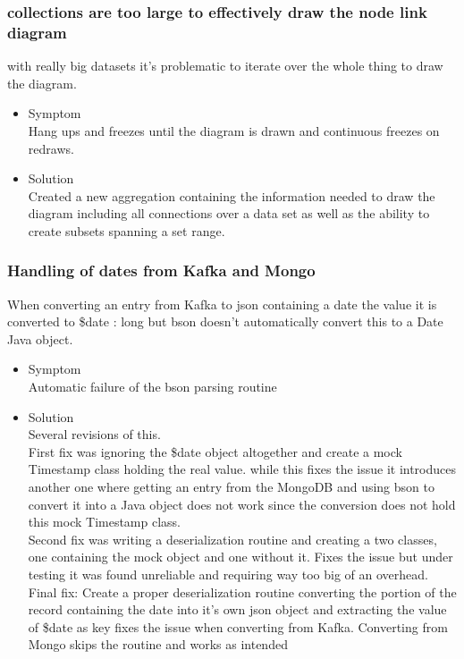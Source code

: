 \documentclass[oneside, english, final]{design}
\begin{document}
\subsubsection{collections are too large to effectively draw the node link diagram}

with really big datasets it's problematic to iterate over the whole thing to draw the diagram.

\begin{itemize}
      \item{Symptom
            \\
            Hang ups and freezes until the diagram is drawn and continuous freezes on redraws.
	}
      \item{Solution
            \\
            Created a new aggregation containing the information needed to draw the diagram including all connections over a data set as well as the ability to create subsets spanning a set range.
            }
\end{itemize}

\subsubsection{Handling of dates from Kafka and Mongo}

When converting an entry from Kafka to json containing a date the value it is converted to {\$date : long} but bson doesn't automatically convert this to a Date Java object.

\begin{itemize}
      \item{Symptom
            \\
            Automatic failure of the bson parsing routine
	}
      \item{Solution
            \\
            Several revisions of this.
            \\
            First fix was ignoring the \$date object altogether and create a mock Timestamp class holding the real value. while this fixes the issue it introduces another one where getting an entry from the MongoDB and using bson to convert it into a Java object does not work since the conversion does not hold this mock Timestamp class.\\
            Second fix was writing a deserialization routine and creating a two classes, one containing the mock object and one without it. Fixes the issue but under testing it was found unreliable and requiring way too big of an overhead.\\
            Final fix: Create a proper deserialization routine converting the portion of the record containing the date into it's own json object and extracting the value of \$date as key fixes the issue when converting from Kafka. Converting from Mongo skips the routine and works as intended
            }
\end{itemize}
\end{document}
